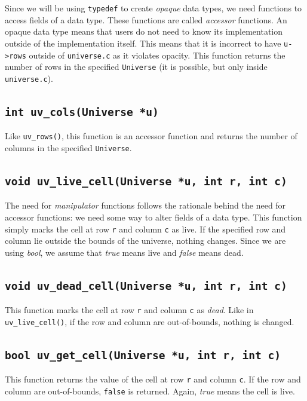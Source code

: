 \documentclass[11pt]{article}
\begin{document}
Since we will be using \texttt{typedef} to create \emph{opaque} data types, we
need functions to access fields of a data type. These functions are called
\emph{accessor} functions. An opaque data type means that users do not need to know its
implementation outside of the implementation itself. This means that it is
incorrect to have \texttt{u->rows} outside of \texttt{universe.c} as it violates
opacity. 
This function returns the number of rows in the specified \texttt{Universe} (it is possible, but only inside \texttt{universe.c}).


\subsection{\texttt{int uv\_cols(Universe *u)}}

Like \texttt{uv\_rows()}, this function is an accessor function and returns the
number of columns in the specified \texttt{Universe}.


\subsection{\texttt{void uv\_live\_cell(Universe *u, int r, int c)}}

The need for \emph{manipulator} functions follows the rationale behind the need
for accessor functions: we need some way to alter fields of a data type. This
function simply marks the cell at row \texttt{r} and column \texttt{c} as live.
If the specified row and column lie outside the bounds of the universe, nothing
changes. Since we are using \emph{bool}, we assume that \emph{true} means live
and \emph{false} means dead.


\subsection{\texttt{void uv\_dead\_cell(Universe *u, int r, int c)}}

This function marks the cell at row \texttt{r} and column \texttt{c} as \emph{dead}.
Like in \texttt{uv\_live\_cell()}, if the row and column are out-of-bounds,
nothing is changed.


\subsection{\texttt{bool uv\_get\_cell(Universe *u, int r, int c)}}

This function returns the value of the cell at row
\texttt{r} and column \texttt{c}. If the row and column are out-of-bounds,
\texttt{false} is returned. Again, \emph{true} means the cell is live.
\end{document}

